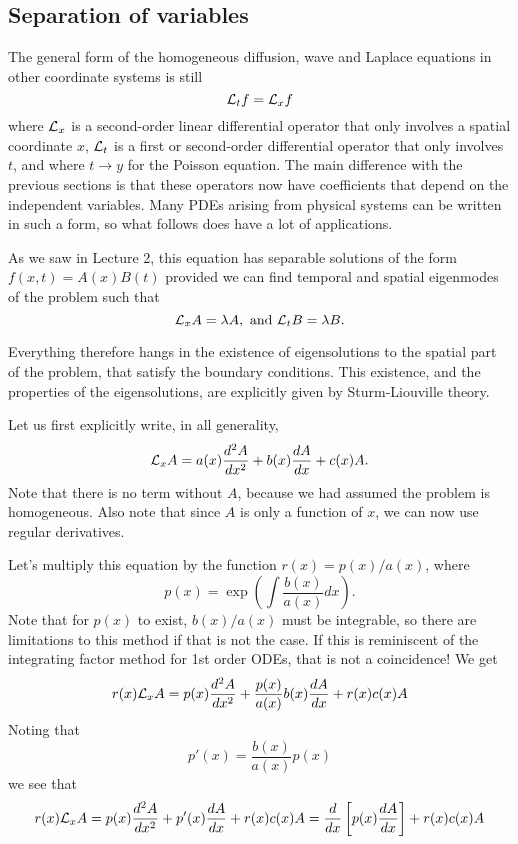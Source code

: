 \subsection{Separation of variables}

The general form of the homogeneous diffusion, wave and Laplace equations in other coordinate systems is still
\begin{equation}
   {\cal L}_t f = {\cal L}_x f  
\end{equation}
where ${\cal L}_x$ is a second-order linear differential operator that only involves a spatial coordinate $x$, ${\cal L}_t$ is a first or second-order differential operator that only involves $t$, and  
where $t \rightarrow y$ for the Poisson equation. The main difference with the previous sections is that these operators now have coefficients that depend on the independent variables. Many PDEs arising from physical systems can be written in such a form, so what follows does have a lot of applications. 

As we saw in Lecture 2, this equation has separable solutions of the form $f(x,t) = A(x) B(t)$ provided we can find temporal and spatial eigenmodes of the problem such that 
\begin{equation}
    {\cal L}_x A = \lambda A, \mbox{ and }{\cal L}_t B = \lambda B. 
\end{equation}

Everything therefore hangs in the existence of eigensolutions to the spatial part of the problem, that satisfy the boundary conditions. This existence, and the properties of the eigensolutions, are explicitly given by Sturm-Liouville theory.

Let us first explicitly write, in all generality,
\begin{equation}
    {\cal L}_x A = a(x) \frac{d^2 A}{d x^2} + b(x) \frac{d A}{dx} + c(x) A. 
\end{equation}
Note that there is no term without $A$, because we had assumed the problem is homogeneous. Also note that since $A$ is only a function of $x$, we can now use regular derivatives. 

Let's multiply this equation by the function $r(x) = p(x)/a(x)$, where 
\begin{equation}
    p(x) = \exp\left( \int \frac{b(x)}{a(x)} dx \right).
\end{equation}
Note that for $p(x)$ to exist, $b(x)/a(x)$ must be integrable, so there are limitations to this method if that is not the case.
If this is reminiscent of the integrating factor method for 1st order ODEs, that is not a coincidence! We get
\begin{equation}
    r(x) {\cal L}_x A = p(x) \frac{d^2 A}{d x^2} + \frac{p(x)}{a(x)} b(x) \frac{d A}{d x} + r(x) c(x) A 
\end{equation}
Noting that 
\begin{equation}
    p'(x) = \frac{b(x)}{a(x)} p(x)
\end{equation}
we see that \begin{equation}
    r(x) {\cal L}_x A = p(x) \frac{d^2 A}{d x^2} + p'(x) \frac{d A}{d x} + r(x) c(x) A = \frac{d}{dx} \left[ p(x) \frac{dA}{dx}\right] + r(x) c(x) A  
\end{equation}

